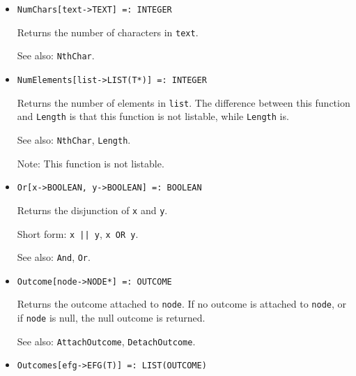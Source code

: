 \begin{itemize}
{\it for any type } {\tt T}.
\bd
Returns a null object of type \verb+T+.  
\ed

\item{}
\protect \large \begin{verbatim}
NumChars[text->TEXT] =: INTEGER
\end{verbatim}\normalsize

\bd
Returns the number of characters in \verb+text+.
\item [See also:] \verb+NthChar+.
\ed

\item{}
\protect \large \begin{verbatim}
NumElements[list->LIST(T*)] =: INTEGER
\end{verbatim}\normalsize

\bd
Returns the number of elements in \verb+list+.  The difference between
this function and \verb+Length+ is that this function is not listable,
while \verb+Length+ is.  
\item
[See also:] \verb+NthChar+, \verb+Length+.
\item
[Note:] This function is not listable. 
\ed


\item{} 
\protect \large \begin{verbatim}
Or[x->BOOLEAN, y->BOOLEAN] =: BOOLEAN
\end{verbatim} \normalsize
  
\bd
Returns the disjunction of \verb+x+ and \verb+y+.
\item
[Short form:] \verb+x || y+, \verb+x OR y+.
\item [See also:] \verb+And+, \verb+Or+.
\ed

\item{}
\protect \large \begin{verbatim}
Outcome[node->NODE*] =: OUTCOME
\end{verbatim}\normalsize

\bd
Returns the outcome attached to \verb+node+.  If no outcome is attached
to \verb+node+, or if \verb+node+ is null, the null outcome is returned.
\item [See also:] \verb+AttachOutcome+, \verb+DetachOutcome+.
\ed

\item{}
\protect \large \begin{verbatim}
Outcomes[efg->EFG(T)] =: LIST(OUTCOME)
\end{verbatim}\normalsize


\end{itemize}
